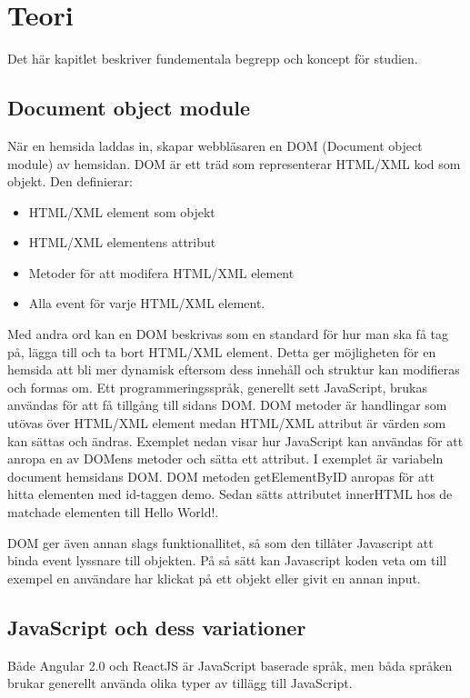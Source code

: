 \section{Teori}
\label{sec:axel-theory}
Det här kapitlet beskriver fundementala begrepp och koncept för studien.

\subsection{Document object module}
När en hemsida laddas in, skapar webbläsaren en DOM (Document object module) av hemsidan. DOM är ett träd som representerar HTML/XML kod som objekt. Den definierar:

\begin{itemize}
\item HTML/XML element som objekt
\item HTML/XML elementens attribut
\item Metoder för att modifera HTML/XML element
\item Alla event för varje HTML/XML element.
\end{itemize} 

Med andra ord kan en DOM beskrivas som en standard för hur man ska få tag på, lägga till och ta bort HTML/XML element. Detta ger möjligheten för en hemsida att bli mer dynamisk eftersom dess innehåll och struktur kan modifieras och formas om. Ett programmeringsspråk, generellt sett JavaScript, brukas användas för att få tillgång till sidans DOM. DOM metoder är handlingar som utövas över HTML/XML element medan HTML/XML attribut är värden som kan sättas och ändras. Exemplet nedan visar hur JavaScript kan användas för att anropa en av DOMens metoder och sätta ett attribut. I exemplet är variabeln document hemsidans DOM. DOM metoden getElementByID anropas för att hitta elementen med id-taggen demo. Sedan sätts attributet innerHTML hos de matchade elementen till Hello World!. 

DOM ger även annan slags funktionallitet, så som den tillåter Javascript att binda event lyssnare till objekten. På så sätt kan Javascript koden veta om till exempel en användare har klickat på ett objekt eller givit en annan input.


\subsection{JavaScript och dess variationer}
Både Angular 2.0 och ReactJS är JavaScript baserade språk, men båda språken brukar generellt använda olika typer av tillägg till JavaScript.

